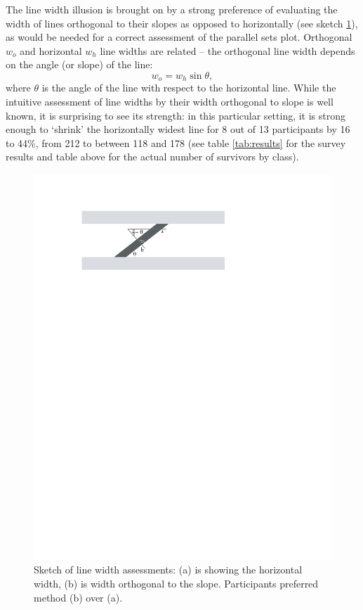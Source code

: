 The line width illusion is brought on by a strong preference of evaluating the width of lines orthogonal to their slopes as opposed to horizontally (see sketch \ref{fig:linewidth}), as would be needed for a correct assessment of the parallel sets plot.
Orthogonal $w_o$ and horizontal $w_h$ line widths are related -- the orthogonal line width depends on the angle (or slope) of the line:
\begin{equation}\label{adjust}
w_o = w_h \sin \theta,
\end{equation}
where $\theta$ is the angle of the line with respect to the horizontal line.
While the intuitive assessment of line widths by their width orthogonal to slope is well known, it is surprising to see its strength: in this particular setting, it is strong enough to `shrink' the horizontally widest line for 8 out of 13 participants by  16 to 44\%, from 212 to between 118 and 178 (see table \ref{tab:results} for the survey results and table above for the actual number of survivors by class). 

\begin{figure}[htbp]
\begin{center}
\includegraphics[width=0.6\linewidth]{images/linewidth}
\end{center}
\caption{\label{fig:linewidth}Sketch of line width assessments: (a) is showing the horizontal width, (b) is  width orthogonal to the slope. Participants preferred method (b) over (a).}
\end{figure}

